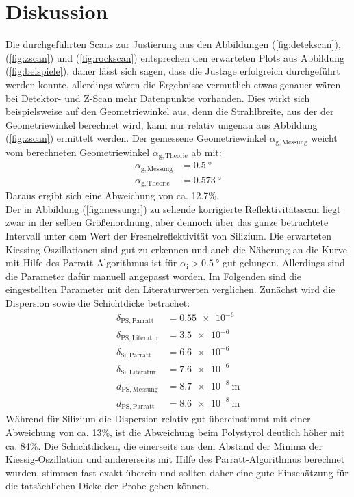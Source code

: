 \section{Diskussion}
\label{sec:Diskussion}
Die durchgeführten Scans zur Justierung aus den Abbildungen (\ref{fig:detekscan}), (\ref{fig:zscan}) und (\ref{fig:rockscan}) entsprechen den erwarteten
Plots aus Abbildung (\ref{fig:beispiele}), daher lässt sich sagen, dass die Justage
erfolgreich durchgeführt werden konnte, allerdings wären die Ergebnisse vermutlich etwas genauer wären bei Detektor- und Z-Scan mehr Datenpunkte vorhanden. Dies wirkt sich beispielsweise auf den Geometriewinkel aus, denn die Strahlbreite, aus der der Geometriewinkel berechnet wird, kann nur relativ ungenau
aus Abbildung (\ref{fig:zscan}) ermittelt werden. Der gemessene Geometriewinkel $\alpha_\mathrm{g,Messung}$ weicht vom berechneten Geometriewinkel $\alpha_\mathrm{g,Theorie}$ ab mit:
\begin{align*}
  \alpha_\mathrm{g,Messung}&= \SI{0.5}{\degree} \\
  \alpha_\mathrm{g,Theorie}&= \SI{0.573}{\degree}
\end{align*}
Daraus ergibt sich eine Abweichung von ca. 12.7\%. \\

\noindent Der in Abbildung (\ref{fig:messungr}) zu sehende korrigierte Reflektivitätsscan liegt zwar in der selben Größenordnung, aber dennoch
über das ganze betrachtete Intervall unter dem Wert der Fresnelreflektivität von Silizium. Die erwarteten Kiessing-Oszillationen sind gut zu erkennen und auch die Näherung an
die Kurve mit Hilfe des Parratt-Algorithmus ist für $\alpha_\mathrm{i}>\SI{0.5}{\degree}$ gut gelungen. Allerdings sind die Parameter dafür manuell angepasst worden. Im Folgenden
sind die eingestellten Parameter mit den Literaturwerten \cite[5]{Anleitung3} verglichen. Zunächst wird die Dispersion sowie die Schichtdicke betrachet:
\begin{align*}
  \delta_\mathrm{PS,Parratt}&= \SI{0.55 e-6}{} \\
  \delta_\mathrm{PS,Literatur}&= \SI{3.5 e-6}{} \\
  \delta_\mathrm{Si,Parratt}&= \SI{6.6 e-6}{} \\
  \delta_\mathrm{Si,Literatur}&= \SI{7.6 e-6}{} \\
  d_\mathrm{PS,Messung}&=\SI{8.7 e-8}{\meter} \\
  d_\mathrm{PS,Parratt}&=\SI{8.6 e-8}{\meter}
\end{align*}
Während für Silizium die Dispersion relativ gut übereinstimmt mit einer Abweichung von ca. 13\%, ist die Abweichung beim Polystyrol deutlich höher mit ca. 84\%.
Die Schichtdicken, die einerseits aus dem Abstand der Minima der Kiessig-Oszillation und andererseits mit Hilfe des Parratt-Algorithmus berechnet wurden, stimmen fast exakt überein und sollten
daher eine gute Einschätzung für die tatsächlichen Dicke der Probe geben können. \\

